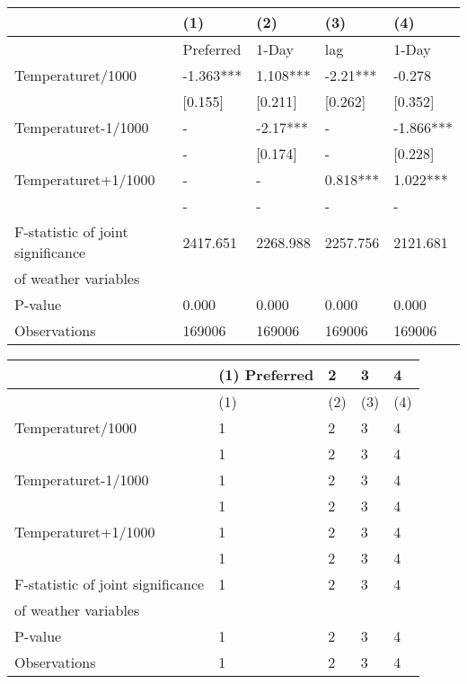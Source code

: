 \documentclass[11pt]{article}
\begin{document}
\begin{tabular}{lllll}
	\toprule
	{} &        (1) &       (2) &       (3) &        (4) \\
	\midrule
	&  Preferred &     1-Day &       lag &      1-Day \\
	Temperaturet/1000                 &  -1.363*** &  1.108*** &  -2.21*** &     -0.278 \\
	&    [0.155] &   [0.211] &   [0.262] &    [0.352] \\
	Temperaturet-1/1000               &          - &  -2.17*** &         - &  -1.866*** \\
	&          - &   [0.174] &         - &    [0.228] \\
	Temperaturet+1/1000               &          - &         - &  0.818*** &   1.022*** \\
	&          - &         - &         - &          - \\
	F-statistic of joint significance &   2417.651 &  2268.988 &  2257.756 &   2121.681 \\
	of weather variables              &            &           &           &            \\
	P-value                           &      0.000 &     0.000 &     0.000 &      0.000 \\
	\midrule
	Observations                      &     169006 &    169006 &    169006 &     169006 \\
	\bottomrule
\end{tabular}







\begin{tabular}{lllll}
	\toprule[1.5pt]
	{} & (1)
	Preferred &    2 &    3 &    4 \\
	\midrule
	&           (1) &  (2) &  (3) &  (4) \\
	Temperaturet/1000                 &             1 &    2 &    3 &    4 \\
	&             1 &    2 &    3 &    4 \\
	Temperaturet-1/1000               &             1 &    2 &    3 &    4 \\
	&             1 &    2 &    3 &    4 \\
	Temperaturet+1/1000               &             1 &    2 &    3 &    4 \\
	&             1 &    2 &    3 &    4 \\
	\midrule
	F-statistic of joint significance &             1 &    2 &    3 &    4 \\
	of weather variables              &               &      &      &      \\
	P-value                           &             1 &    2 &    3 &    4 \\
	\midrule
	Observations                      &             1 &    2 &    3 &    4 \\
	\bottomrule[2pt]
\end{tabular}
\end{document}
